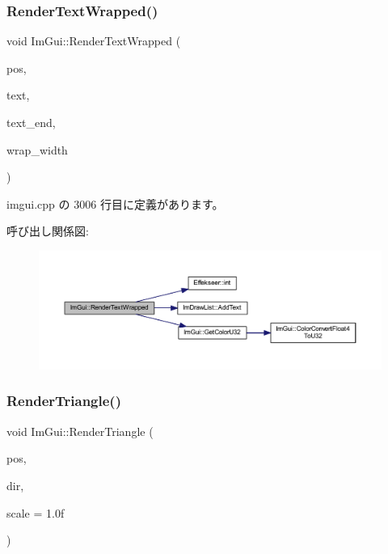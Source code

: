 \subsubsection{\texorpdfstring{Render\+Text\+Wrapped()}{RenderTextWrapped()}}
{\footnotesize\ttfamily void Im\+Gui\+::\+Render\+Text\+Wrapped (\begin{DoxyParamCaption}\item[{\mbox{\hyperlink{struct_im_vec2}{Im\+Vec2}}}]{pos,  }\item[{const char $\ast$}]{text,  }\item[{const char $\ast$}]{text\+\_\+end,  }\item[{float}]{wrap\+\_\+width }\end{DoxyParamCaption})}



 imgui.\+cpp の 3006 行目に定義があります。

呼び出し関係図\+:\nopagebreak
\begin{figure}[H]
\begin{center}
\leavevmode
\includegraphics[width=350pt]{namespace_im_gui_aa483b40f6899e1b289b4bf6c2673d1d2_cgraph}
\end{center}
\end{figure}
\mbox{\label{namespace_im_gui_ad11a82904a65722d285230567af826b8}} 
\subsubsection{\texorpdfstring{Render\+Triangle()}{RenderTriangle()}}
{\footnotesize\ttfamily void Im\+Gui\+::\+Render\+Triangle (\begin{DoxyParamCaption}\item[{\mbox{\hyperlink{struct_im_vec2}{Im\+Vec2}}}]{pos,  }\item[{\mbox{\hyperlink{imgui__internal_8h_a4b8427c5153ae1d43278dc397d809335}{Im\+Gui\+Dir}}}]{dir,  }\item[{float}]{scale = {\ttfamily 1.0f} }\end{DoxyParamCaption})}



